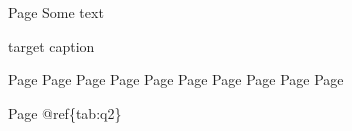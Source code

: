 \documentclass[
]{article}
\author{}
\date{\vspace{-2.5em}}
\begin{document}
{
\setcounter{tocdepth}{2}
\tableofcontents
}
\newpage

Page \pageref{variable_name}
\newpage
Some text
\newpage

\newpage

\label{label} target caption

Page \pageref{con_var}
Page \pageref{age}
Page \pageref{ethnicity}
Page \pageref{sex}
Page \pageref{q1}
Page \pageref{religion}
Page \pageref{q2}
Page \pageref{is_religious}
Page \pageref{q5}
Page \pageref{q7}

Page @ref\{tab:q2\}


 
  \providecommand{\huxb}[2]{\arrayrulecolor[RGB]{#1}\global\arrayrulewidth=#2pt}
  \providecommand{\huxvb}[2]{\color[RGB]{#1}\vrule width #2pt}
  \providecommand{\huxtpad}[1]{\rule{0pt}{#1}}
  \providecommand{\huxbpad}[1]{\rule[-#1]{0pt}{#1}}
\end{document}

